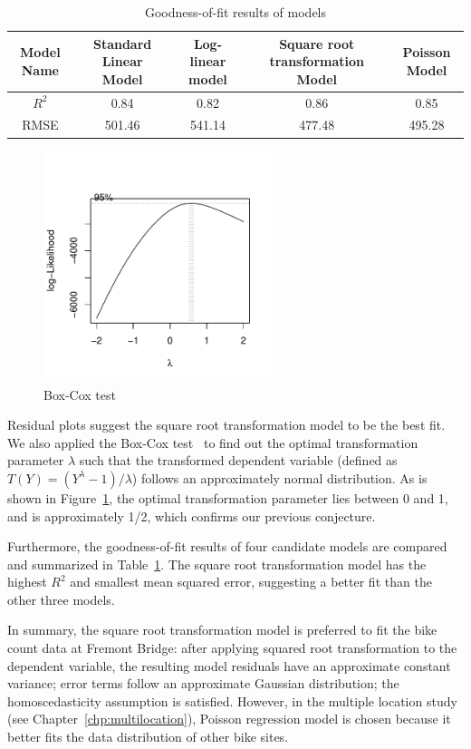 \documentclass [11pt, proquest] {uwthesis}[2015/03/03]
\begin{document}
\begin{table}
\caption{Goodness-of-fit results of models} 
  \label{tbl:ytransform} 
\small
\begin{tabular}{ c | c | c | c | c } 
\hline 
  Model Name & Standard Linear Model & Log-linear model & Square root transformation Model & Poisson Model \\ 
\hline
  $R^2$  & 0.84 & 0.82 & 0.86 & 0.85 \\ 
  RMSE  & 501.46 & 541.14 & 477.48 & 495.28 \\ 
\hline 
\end{tabular} 
\end{table} 

\begin{figure}
\centering
   \includegraphics[width=0.6\textwidth]{figures/boxcox} 
  \caption{Box-Cox test }
  \label{fig:boxcox}
\end{figure}


Residual plots suggest the square root transformation model to be the best fit. We also applied the Box-Cox test~\cite{boxcox64} to find out the optimal transformation parameter $\lambda$ such that the transformed dependent variable (defined as $T(Y) = (Y^{\lambda}-1)/\lambda$) follows an approximately normal distribution. As is shown in Figure~\ref{fig:boxcox}, the optimal transformation parameter lies between 0 and 1, and is approximately 1/2, which confirms our previous conjecture.

Furthermore, the goodness-of-fit results of four candidate models are compared and summarized in Table~\ref{tbl:ytransform}. The square root transformation model has the highest $R^2$ and smallest mean squared error, suggesting a better fit than the other three models.

In summary, the square root transformation model is preferred to fit the bike count data at Fremont Bridge: after applying squared root transformation to the dependent variable, the resulting model residuals have an approximate constant variance; error terms follow an approximate Gaussian distribution; the homoscedasticity assumption is satisfied. However, in the multiple location study (see Chapter~\ref{chp:multilocation}), Poisson regression model is chosen because it better fits the data distribution of other bike sites.
\end{document}
